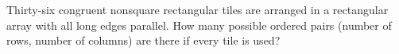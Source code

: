 Thirty-six congruent nonsquare rectangular tiles are arranged in a rectangular array with all long edges parallel. How many possible ordered pairs (number of rows, number of columns) are there if every tile is used?
